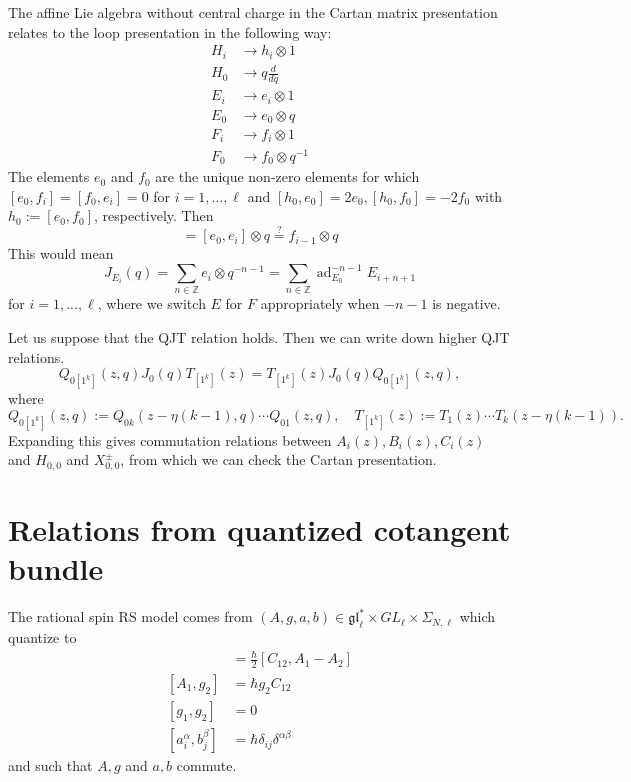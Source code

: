 \documentclass[11pt]{report}
\theoremstyle{definition}
\theoremstyle{remark}
\theoremstyle{remark}
\newcommand{\Z}{\mathbb{Z}}
\begin{document}
The affine Lie algebra without central charge in the Cartan matrix presentation relates to the loop presentation in the following way:
\begin{align*}
H_i &\to h_i \otimes 1 \\
H_0 &\to q \frac{d}{dq} \\
E_i &\to e_i \otimes 1 \\
E_0 &\to e_0 \otimes q \\
F_i &\to f_i \otimes 1 \\
F_0 &\to f_0 \otimes q^{-1}
\end{align*}
The elements $e_0$ and $f_0$ are the unique non-zero elements for which $[e_0,f_i] = [f_0,e_i] = 0$ for $i=1,...,\ell$ and $[h_0,e_0] = 2e_0, [h_0,f_0] = -2f_0$ with $h_0 := [e_0,f_0]$, respectively. Then
\begin{equation*}
[E_0,E_i] = [e_0,e_i] \otimes q \overset ?= f_{i-1} \otimes q
\end{equation*}
This would mean
\begin{equation*}
J_{E_i}(q) = \sum_{n \in \Z} e_i \otimes q^{-n-1} = \sum_{n \in \Z} \operatorname{ad}_{E_0}^{-n-1} E_{i+n+1}
\end{equation*}
for $i=1,...,\ell$, where we switch $E$ for $F$ appropriately when $-n-1$ is negative.

Let us suppose that the QJT relation holds. Then we can write down higher QJT relations.
\begin{equation*}
Q_{0[1^k]}(z,q) J_0(q) T_{[1^k]}(z) = T_{[1^k]}(z) J_0(q) Q_{0[1^k]}(z,q),
\end{equation*}
where
\begin{equation*}
Q_{0[1^k]}(z,q) := Q_{0k}(z-\eta(k-1),q) \cdots Q_{01}(z,q), \quad
T_{[1^k]}(z) := T_1(z) \cdots T_k(z-\eta(k-1)).
\end{equation*}
Expanding this gives commutation relations between $A_i(z),B_i(z),C_i(z)$ and $H_{0,0}$ and $X_{0,0}^\pm$, from which we can check the Cartan presentation.

\section{Relations from quantized cotangent bundle}

The rational spin RS model comes from $(A, g, a, b) \in \mathfrak{gl}_\ell^* \times GL_\ell \times \Sigma_{N,\ell}$ which quantize to
\begin{align*}
[A_1,A_2] &= \frac{\hbar}{2} [C_{12},A_1-A_2] \\
[A_1,g_2] &=	 \hbar g_2 C_{12} \\
[g_1,g_2] &= 0 \\
[a_i^\alpha,b_j^\beta] &= \hbar \delta_{ij} \delta^{\alpha\beta}
\end{align*}
and such that $A,g$ and $a,b$ commute.
\end{document}
